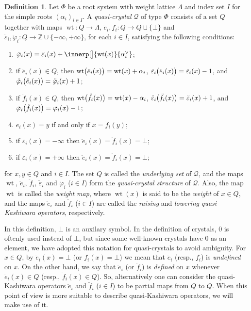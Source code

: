 \documentclass[a4paper,reqno]{amsart}
\numberwithin{equation}{section}
\theoremstyle{plain}
\theoremstyle{definition}
\newtheorem{dfn}[thm]{Definition}
\theoremstyle{remark}
\newcommand*{\dtgterm}[1]{\emph{#1}}  %
\newcommand*{\Z}{\mathbb{Z}}               %
\DeclarePairedDelimiter{\parens}{\lparen}{\rparen}
\newcommand*{\alphav}{\alpha^{\vee}}
\DeclareMathOperator{\wt}{wt}
\newcommand*{\undf}{\bot}  %
\newcommand*{\qcrst}[1]{\mathcal{#1}}
\newcommand*{\qcrstQ}{\qcrst{Q}}
\newcommand*{\qKoe}{\ddot{e}}
\newcommand*{\qKof}{\ddot{f}}
\newcommand*{\qKoec}{\ddot{\varepsilon}}
\newcommand*{\qKofc}{\ddot{\varphi}}
\begin{document}
\begin{dfn}
\label{dfn:qc}
Let $\Phi$ be a root system with weight lattice $\Lambda$ and index set $I$ for the simple roots $(\alpha_i)_{i \in I}$.
A \dtgterm{quasi-crystal} $\qcrstQ$ of type $\Phi$ consists of a set $Q$ together with maps ${\wt} : Q \to \Lambda$, $\qKoe_i, \qKof_i : Q \to Q \sqcup \{\undf\}$ and $\qKoec_i, \qKofc_i : Q \to \Z \cup \{ {-\infty}, {+\infty} \}$, for each $i \in I$, satisfying the following conditions:
\begin{enumerate}
\item\label{dfn:qcwt}
$\qKofc_i (x) = \qKoec_i (x) + \innerp[\big]{\wt (x)}{\alphav_i}$;

\item\label{dfn:qcqKoe}
if $\qKoe_i (x) \in Q$, then
$\wt \parens[\big]{ \qKoe_i (x) } = \wt (x) + \alpha_i$,
$\qKoec_i \parens[\big]{ \qKoe_i (x) } = \qKoec_i (x) - 1$, and
$\qKofc_i \parens[\big]{ \qKoe_i (x) } = \qKofc_i (x) + 1$;

\item\label{dfn:qcqKof}
if $\qKof_i (x) \in Q$, then
$\wt \parens[\big]{ \qKof_i (x) } = \wt (x) - \alpha_i$,
$\qKoec_i \parens[\big]{ \qKof_i (x) } = \qKoec_i (x) + 1$, and
$\qKofc_i \parens[\big]{ \qKof_i (x) } = \qKofc_i (x) - 1$;

\item\label{dfn:qciff}
$\qKoe_i (x) = y$ if and only if $x = \qKof_i (y)$;

\item\label{dfn:qcminfty}
if $\qKoec_i (x) = -\infty$ then $\qKoe_i (x) = \qKof_i (x) = \undf$;

\item\label{dfn:qcpinfty}
if $\qKoec_i (x) = +\infty$ then $\qKoe_i (x) = \qKof_i (x) = \undf$;
\end{enumerate}
for $x, y \in Q$ and $i \in I$. The set $Q$ is called the \dtgterm{underlying set} of $\qcrstQ$, and the maps $\wt$, $\qKoe_i$, $\qKof_i$, $\qKoec_i$ and $\qKofc_i$ ($i \in I$) form the \dtgterm{quasi-crystal structure} of $\qcrstQ$. Also, the map $\wt$ is called the \dtgterm{weight map}, where $\wt (x)$ is said to be the \dtgterm{weight} of $x \in Q$, and the maps $\qKoe_i$ and $\qKof_i$ ($i \in I$) are called the \dtgterm{raising} and \dtgterm{lowering quasi-Kashiwara operators}, respectively.
\end{dfn}

In this definition, $\undf$ is an auxilary symbol. In the definition of crystals, $0$ is oftenly used instead of $\undf$, but since some well-known crystals have $0$ as an element, we have adopted this notation for quasi-crystals to avoid ambiguity.
For $x \in Q$, by $\qKoe_i (x) = \undf$ (or $\qKof_i (x) = \undf$) we mean that $\qKoe_i$ (resp., $\qKof_i$) is \dtgterm{undefined} on $x$. On the other hand, we say that $\qKoe_i$ (or $\qKof_i$) is \dtgterm{defined} on $x$ whenever $\qKoe_i (x) \in Q$ (resp., $\qKof_i (x) \in Q$).
So, alternatively one can consider the quasi-Kashiwara operators $\qKoe_i$ and $\qKof_i$ ($i \in I$) to be partial maps from $Q$ to $Q$.
When this point of view is more suitable to describe quasi-Kashiwara operators, we will make use of it.
\end{document}
